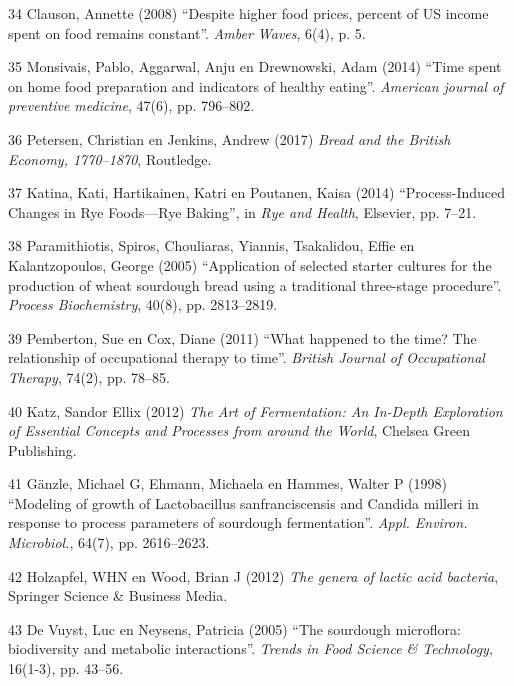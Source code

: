 \documentclass[
  11pt,
  dutch,
]{memoir}
\newlength{\cslhangindent}
\newenvironment{cslreferences}%
  {\setlength{\parindent}{0pt}%
  \everypar{\setlength{\hangindent}{\cslhangindent}}\ignorespaces}%
  {\par}
\begin{document}
\begin{cslreferences}
\leavevmode\hypertarget{ref-clauson2008despite}{}%
34 Clauson, Annette (2008) ``Despite higher food prices, percent of US
income spent on food remains constant''. \emph{Amber Waves}, 6(4), p. 5.

\leavevmode\hypertarget{ref-monsivais2014time}{}%
35 Monsivais, Pablo, Aggarwal, Anju en Drewnowski, Adam (2014) ``Time
spent on home food preparation and indicators of healthy eating''.
\emph{American journal of preventive medicine}, 47(6), pp. 796--802.

\leavevmode\hypertarget{ref-petersen2017bread}{}%
36 Petersen, Christian en Jenkins, Andrew (2017) \emph{Bread and the
British Economy, 1770--1870}, Routledge.

\leavevmode\hypertarget{ref-katina2014process}{}%
37 Katina, Kati, Hartikainen, Katri en Poutanen, Kaisa (2014)
``Process-Induced Changes in Rye Foods---Rye Baking'', in \emph{Rye and
Health}, Elsevier, pp. 7--21.

\leavevmode\hypertarget{ref-paramithiotis2005application}{}%
38 Paramithiotis, Spiros, Chouliaras, Yiannis, Tsakalidou, Effie en
Kalantzopoulos, George (2005) ``Application of selected starter cultures
for the production of wheat sourdough bread using a traditional
three-stage procedure''. \emph{Process Biochemistry}, 40(8), pp.
2813--2819.

\leavevmode\hypertarget{ref-pemberton2011happened}{}%
39 Pemberton, Sue en Cox, Diane (2011) ``What happened to the time? The
relationship of occupational therapy to time''. \emph{British Journal of
Occupational Therapy}, 74(2), pp. 78--85.

\leavevmode\hypertarget{ref-katz}{}%
40 Katz, Sandor Ellix (2012) \emph{The Art of Fermentation: An In-Depth
Exploration of Essential Concepts and Processes from around the World},
Chelsea Green Publishing.

\leavevmode\hypertarget{ref-ganzle1998modeling}{}%
41 Gänzle, Michael G, Ehmann, Michaela en Hammes, Walter P (1998)
``Modeling of growth of Lactobacillus sanfranciscensis and Candida
milleri in response to process parameters of sourdough fermentation''.
\emph{Appl. Environ. Microbiol.}, 64(7), pp. 2616--2623.

\leavevmode\hypertarget{ref-holzapfel2012genera}{}%
42 Holzapfel, WHN en Wood, Brian J (2012) \emph{The genera of lactic
acid bacteria}, Springer Science \& Business Media.

\leavevmode\hypertarget{ref-de2005sourdough}{}%
43 De Vuyst, Luc en Neysens, Patricia (2005) ``The sourdough microflora:
biodiversity and metabolic interactions''. \emph{Trends in Food Science
\& Technology}, 16(1-3), pp. 43--56.


\end{cslreferences}
\end{document}
